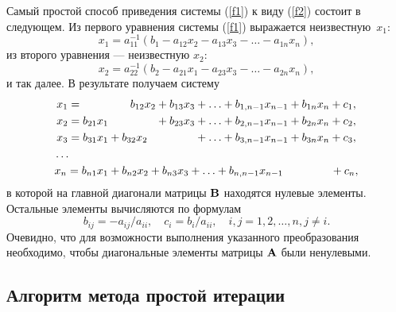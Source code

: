 \documentclass[12pt]{article}
\begin{document}
	Самый простой способ приведения системы (\ref{f1}) к виду (\ref{f2}) состоит в следующем. Из первого уравнения системы (\ref{f1}) выражается неизвестную~$x_1$:
	\begin{equation}
		x_1=a_{11}^{-1}\left(b_1-a_{12}x_2-a_{13}x_3-\ldots-a_{1n}x_n\right),
	\end{equation}
	из второго уравнения --- неизвестную $x_2$:
	\begin{equation}
		x_2=a_{22}^{-1}\left(b_2-a_{21}x_1-a_{23}x_3-\ldots-a_{2n}x_n\right),
	\end{equation}
	и так далее. В результате получаем систему
	\begin{equation}
		\begin{gathered}
			x_1=\hspace{15mm} b_{12}x_2+b_{13}x_3+\ldots+b_{1,n-1}x_{n-1}+b_{1n}x_n+c_1,\\
			x_2=b_{21}x_1\hspace{15mm} +b_{23}x_3+\ldots+b_{2,n-1}x_{n-1}+b_{2n}x_n+c_2,\\
			x_3=b_{31}x_1+b_{32}x_2\hspace{15mm}+\ldots+b_{3,n-1}x_{n-1}+b_{3n}x_n+c_3,\\
			\ldots\hspace{91mm}\\
			x_n=b_{n1}x_1+b_{n2}x_2+b_{n3}x_3+\ldots+ b_{n,n-1}x_{n-1}\hspace{15mm}+c_n,\\
		\end{gathered}
	\end{equation}
	в которой на главной диагонали матрицы $\bold{B}$ находятся нулевые элементы. Остальные элементы вычисляются по формулам
	\begin{equation}
		b_{ij}=-a_{ij}/a_{ii},\quad c_i=b_i/a_{ii},\quad i,j=1,2,\ldots,n,j \neq i.
	\end{equation}
	Очевидно, что для возможности выполнения указанного преобразования необходимо, чтобы диагональные элементы матрицы $\bold{A}$ были ненулевыми.
	
	\subsection*{Алгоритм метода простой итерации}
	
\end{document}
